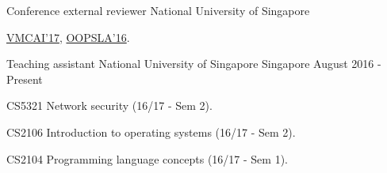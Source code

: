 

\begin{cventries}

  \cventry
    {Conference external reviewer} %
    {National University of Singapore} %
    {} %
    {} %
    {
      \begin{cvitems} %
        \item {\href{http://conf.researchr.org/home/VMCAI-2017}{VMCAI'17}, \href{http://2016.splashcon.org/track/splash-2016-oopsla}{OOPSLA'16}.}
      \end{cvitems}
    }

  \cventry
    {Teaching assistant} %
    {National University of Singapore} %
    {Singapore} %
    {August 2016 - Present} %
    {
      \begin{cvitems} %
        \item {CS5321 Network security (16/17 - Sem 2).}
        \item {CS2106 Introduction to operating systems (16/17 - Sem 2).}
        \item {CS2104 Programming language concepts (16/17 - Sem 1).}
      \end{cvitems}
    }

\end{cventries}
